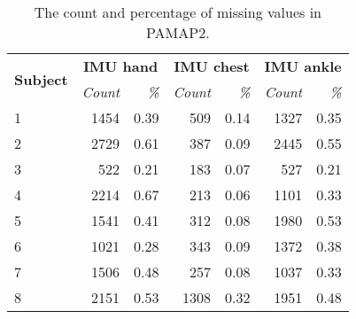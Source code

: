 \documentclass{sigchi}
\begin{document}
\begin{table}[t]
    \centering
    \begin{tabular}{lrrrrrr}\toprule
        \multirow{2}{*}{\textbf{Subject}} & \multicolumn{2}{c}{\textbf{IMU hand}} & \multicolumn{2}{c}{\textbf{IMU chest}} & \multicolumn{2}{c}{\textbf{IMU ankle}}\\
        \cmidrule(r){2-3} \cmidrule(r){4-5} \cmidrule(r){6-7}
        & \emph{Count} & \emph{\%} & \emph{Count} & \emph{\%} & \emph{Count} & \emph{\%} \\ \midrule
        1 & 1454 & 0.39 & 509 & 0.14 & 1327 & 0.35 \\
        2 & 2729 & 0.61 & 387 & 0.09 & 2445 & 0.55 \\
        3 & 522  & 0.21 & 183 & 0.07 & 527  & 0.21 \\
        4 & 2214 & 0.67 & 213 & 0.06 & 1101 & 0.33 \\
        5 & 1541 & 0.41 & 312 & 0.08 & 1980 & 0.53 \\
        6 & 1021 & 0.28 & 343 & 0.09 & 1372 & 0.38 \\
        7 & 1506 & 0.48 & 257 & 0.08 & 1037 & 0.33 \\
        8 & 2151 & 0.53 & 1308 & 0.32 & 1951 & 0.48 \\ \bottomrule
    \end{tabular}
    \caption{The count and percentage of missing values in PAMAP2.}~\label{NA_PAMAP2}
\end{table}
\end{document}
